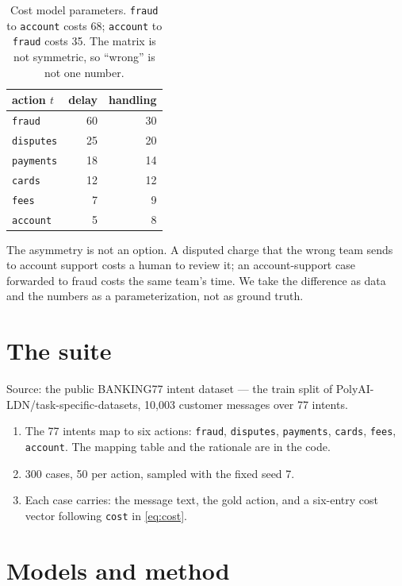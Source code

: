 \documentclass[11pt]{article}
\begin{document}
\begin{table}[h]
\centering
\begin{tabular}{lrr}
\toprule
action $t$ & delay & handling \\
\midrule
\texttt{fraud} & 60 & 30 \\
\texttt{disputes} & 25 & 20 \\
\texttt{payments} & 18 & 14 \\
\texttt{cards} & 12 & 12 \\
\texttt{fees} & 7 & 9 \\
\texttt{account} & 5 & 8 \\
\bottomrule
\end{tabular}
\caption{Cost model parameters. \texttt{fraud} to \texttt{account} costs 68;
\texttt{account} to \texttt{fraud} costs 35. The matrix is not symmetric, so
``wrong'' is not one number.}
\end{table}

The asymmetry is not an option. A disputed charge that the wrong team sends
to account support costs a human to review it; an account-support case
forwarded to fraud costs the same team's time. We take the difference as
data and the numbers as a parameterization, not as ground truth.

\section{The suite}

Source: the public BANKING77 intent dataset — the train split of
PolyAI-LDN/task-specific-datasets, 10,003 customer messages over 77 intents.

\begin{enumerate}
\item The 77 intents map to six actions: \texttt{fraud}, \texttt{disputes},
  \texttt{payments}, \texttt{cards}, \texttt{fees}, \texttt{account}. The
  mapping table and the rationale are in the code.
\item 300 cases, 50 per action, sampled with the fixed seed 7.
\item Each case carries: the message text, the gold action, and a six-entry
  cost vector following \texttt{cost} in \eqref{eq:cost}.
\end{enumerate}

\section{Models and method}
\end{document}
